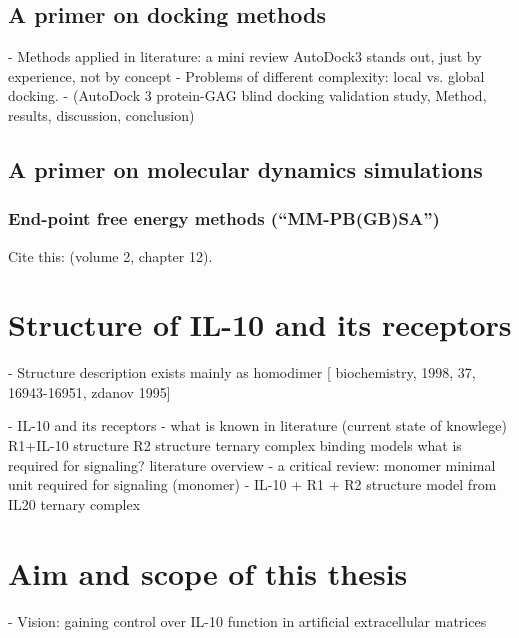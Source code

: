 \subsection{A primer on docking methods}


    - Methods applied in literature: a mini review
        AutoDock3 stands out, just by experience, not by concept
    - Problems of different complexity: local vs. global docking.
    - (AutoDock 3 protein-GAG blind docking validation study,
        Method, results, discussion, conclusion)

\lipsum[1-5]

\subsection{A primer on molecular dynamics simulations}

\lipsum[1-5]

\subsubsection{End-point free energy methods (\enquote{MM-PB(GB)SA})}
\label{methods:mmpbsa_mmgbsa}


Cite this: \cite{schlick_innovationsdynamics_2012} (volume 2, chapter 12).

\lipsum[1-5]

\section{Structure of IL-10 and its receptors}

    - Structure description
        exists mainly as homodimer [
            biochemistry, 1998, 37, 16943-16951, zdanov 1995]


    - IL-10 and its receptors
        - what is known in literature (current state of knowlege)
            R1+IL-10 structure
            R2 structure
            ternary complex binding models
            what is required for signaling? literature overview
        - a critical review: monomer
            minimal unit required for signaling (monomer)
        - IL-10 + R1 + R2 structure model from IL20 ternary complex


\section{Aim and scope of this thesis}

- Vision: gaining control over IL-10 function in artificial extracellular matrices

